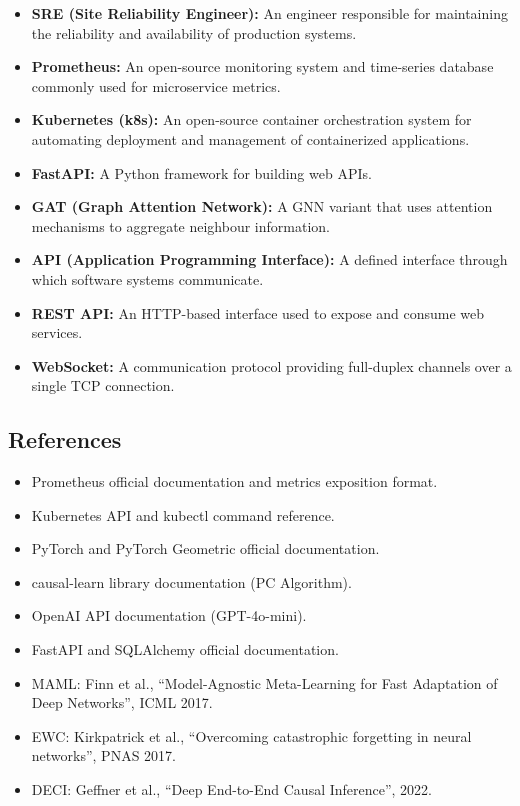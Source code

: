 \documentclass[11pt,a4paper]{article}
\begin{document}
\begin{itemize}
    \item \textbf{SRE (Site Reliability Engineer):} An engineer responsible for maintaining the reliability and availability of production systems.
    \item \textbf{Prometheus:} An open-source monitoring system and time-series database commonly used for microservice metrics.
    \item \textbf{Kubernetes (k8s):} An open-source container orchestration system for automating deployment and management of containerized applications.
    \item \textbf{FastAPI:} A Python framework for building web APIs.
    \item \textbf{GAT (Graph Attention Network):} A GNN variant that uses attention mechanisms to aggregate neighbour information.
    \item \textbf{API (Application Programming Interface):} A defined interface through which software systems communicate.
    \item \textbf{REST API:} An HTTP-based interface used to expose and consume web services.
    \item \textbf{WebSocket:} A communication protocol providing full-duplex channels over a single TCP connection.
\end{itemize}


\subsection{References}

\begin{itemize}
    \item Prometheus official documentation and metrics exposition format.
    \item Kubernetes API and kubectl command reference.
    \item PyTorch and PyTorch Geometric official documentation.
    \item causal-learn library documentation (PC Algorithm).
    \item OpenAI API documentation (GPT-4o-mini).
    \item FastAPI and SQLAlchemy official documentation.
    \item MAML: Finn et al., ``Model-Agnostic Meta-Learning for Fast Adaptation of Deep Networks'', ICML 2017.
    \item EWC: Kirkpatrick et al., ``Overcoming catastrophic forgetting in neural networks'', PNAS 2017.
    \item DECI: Geffner et al., ``Deep End-to-End Causal Inference'', 2022.
\end{itemize}
\end{document}

